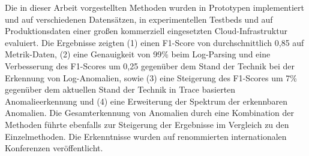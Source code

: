 {Die in dieser Arbeit vorgestellten Methoden wurden in Prototypen implementiert und auf verschiedenen Datensätzen, in experimentellen Testbeds und auf Produktionsdaten einer großen kommerziell eingesetzten Cloud-Infrastruktur evaluiert. Die Ergebnisse zeigten (1) einen F1-Score von durchschnittlich 0,85 auf Metrik-Daten, (2) eine Genauigkeit von 99\% beim Log-Parsing und eine Verbesserung des F1-Scores um 0,25 gegenüber dem Stand der Technik bei der Erkennung von Log-Anomalien, sowie (3) eine Steigerung des F1-Scores um 7\% gegenüber dem aktuellen Stand der Technik in Trace basierten Anomalieerkennung und (4) eine Erweiterung der Spektrum der erkennbaren Anomalien. Die  Gesamterkennung von Anomalien durch eine Kombination der Methoden führte ebenfalls zur Steigerung der Ergebnisse im Vergleich zu den Einzelmethoden. Die Erkenntnisse wurden auf renommierten internationalen Konferenzen veröffentlicht.


}

\endgroup			

\vfill